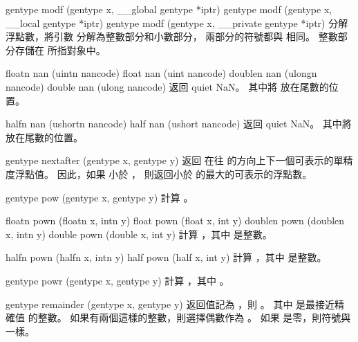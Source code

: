 gentype modf (gentype x,
	__global gentype *iptr)
gentype modf (gentype x,
	__local gentype *iptr)
gentype modf (gentype x,
	__private gentype *iptr)
\stopbuffer
{}
分解浮點數，將引數  分解為整數部分和小數部分，
兩部分的符號都與  相同。
整數部分存儲在  所指對象中。
\stopbuffer

floatn nan (uintn nancode)
float nan (uint nancode)
doublen nan (ulongn nancode)
double nan (ulong nancode)
\stopbuffer
{}
返回 quiet NaN。
其中將  放在尾數的位置。
\stopbuffer

halfn nan (ushortn nancode)
half nan (ushort nancode)
\stopbuffer
{}
返回 quiet NaN。
其中將  放在尾數的位置。
\stopbuffer

gentype nextafter (gentype x,
		gentype y)
\stopbuffer
{}
返回  在往  的方向上下一個可表示的單精度浮點值。
因此，如果  小於 ，
則返回小於  的最大的可表示的浮點數。
\stopbuffer

gentype pow (gentype x, gentype y)
\stopbuffer
{}
計算 。
\stopbuffer

floatn pown (floatn x, intn y)
float pown (float x, int y)
doublen pown (doublen x, intn y)
double pown (double x, int y)
\stopbuffer
{}
計算 ，其中  是整數。
\stopbuffer

halfn pown (halfn x, intn y)
half pown (half x, int y)
\stopbuffer
{}
計算 ，其中  是整數。
\stopbuffer

gentype powr (gentype x,
		gentype y)
\stopbuffer
{}
計算 ，其中 。
\stopbuffer

gentype remainder (gentype x,
		gentype y)
\stopbuffer
{}
返回值記為 ，則 。
其中  是最接近精確值  的整數。
如果有兩個這樣的整數，則選擇偶數作為 。
如果  是零，則符號與  一樣。
\stopbuffer

